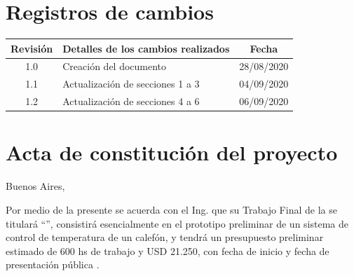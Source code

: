 \documentclass[11pt]{charter}
\begin{document}
\maketitle
\thispagestyle{empty}
\pagebreak


\thispagestyle{empty}
{\setlength{\parskip}{0pt}
\tableofcontents{}
}
\pagebreak


\section{Registros de cambios}
\label{sec:registro}


\begin{table}[ht]
\label{tab:registro}
\centering
\begin{tabularx}{\linewidth}{@{}|c|X|c|@{}}
\hline
\rowcolor[HTML]{C0C0C0} 
Revisión & \multicolumn{1}{c|}{\cellcolor[HTML]{C0C0C0}Detalles de los cambios realizados} & Fecha      \\ \hline
1.0      & Creación del documento                                          & 28/08/2020 \\ \hline
1.1      &  Actualización de secciones 1 a 3                           & 04/09/2020 \\ \hline
1.2      & Actualización de secciones 4 a 6                            & 06/09/2020 \\ \hline
\end{tabularx}
\end{table}

\pagebreak



\section{Acta de constitución del proyecto}
\label{sec:acta}

\begin{flushright}
Buenos Aires, \fechaInicioName
\end{flushright}

\vspace{2cm}

Por medio de la presente se acuerda con el Ing. \authorname\hspace{1px} que su Trabajo Final de la \degreename\hspace{1px} se titulará ``\ttitle'', consistirá esencialmente en el prototipo preliminar de un sistema de control de temperatura de un calefón, y tendrá un presupuesto preliminar estimado de 600 hs de trabajo y USD 21.250, con fecha de inicio \fechaInicioName\hspace{1px} y fecha de presentación pública \fechaFinalName.
\end{document}
